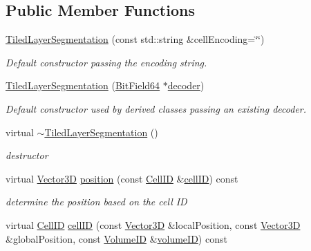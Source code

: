 \subsection*{Public Member Functions}
\begin{DoxyCompactItemize}
\item 
\hyperlink{class_d_d4hep_1_1_d_d_segmentation_1_1_tiled_layer_segmentation_a9f5fb19402d8d5bfbfb6d3db886bdfe3}{Tiled\+Layer\+Segmentation} (const std\+::string \&cell\+Encoding=\char`\"{}\char`\"{})
\begin{DoxyCompactList}\small\item\em Default constructor passing the encoding string. \end{DoxyCompactList}\item 
\hyperlink{class_d_d4hep_1_1_d_d_segmentation_1_1_tiled_layer_segmentation_ade81bfe57661f1faf98877b6e4de725e}{Tiled\+Layer\+Segmentation} (\hyperlink{class_d_d4hep_1_1_d_d_segmentation_1_1_bit_field64}{Bit\+Field64} $\ast$\hyperlink{class_d_d4hep_1_1_d_d_segmentation_1_1_segmentation_abec3489982d0fe91ef4b142d9d755576}{decoder})
\begin{DoxyCompactList}\small\item\em Default constructor used by derived classes passing an existing decoder. \end{DoxyCompactList}\item 
virtual \hyperlink{class_d_d4hep_1_1_d_d_segmentation_1_1_tiled_layer_segmentation_ac4a4730758ab96a1215fb55999503af2}{$\sim$\+Tiled\+Layer\+Segmentation} ()
\begin{DoxyCompactList}\small\item\em destructor \end{DoxyCompactList}\item 
virtual \hyperlink{struct_d_d4hep_1_1_d_d_segmentation_1_1_vector3_d}{Vector3D} \hyperlink{class_d_d4hep_1_1_d_d_segmentation_1_1_tiled_layer_segmentation_acc4571d3ad2ac352f1cfb7fc45d1f2b7}{position} (const \hyperlink{namespace_d_d4hep_1_1_d_d_segmentation_ac7af071d85cb48820914434a07e21ba1}{Cell\+ID} \&\hyperlink{class_d_d4hep_1_1_d_d_segmentation_1_1_tiled_layer_segmentation_acda10c2ad2f498c9b3b580baefe9a8cd}{cell\+ID}) const
\begin{DoxyCompactList}\small\item\em determine the position based on the cell ID \end{DoxyCompactList}\item 
virtual \hyperlink{namespace_d_d4hep_1_1_d_d_segmentation_ac7af071d85cb48820914434a07e21ba1}{Cell\+ID} \hyperlink{class_d_d4hep_1_1_d_d_segmentation_1_1_tiled_layer_segmentation_acda10c2ad2f498c9b3b580baefe9a8cd}{cell\+ID} (const \hyperlink{struct_d_d4hep_1_1_d_d_segmentation_1_1_vector3_d}{Vector3D} \&local\+Position, const \hyperlink{struct_d_d4hep_1_1_d_d_segmentation_1_1_vector3_d}{Vector3D} \&global\+Position, const \hyperlink{namespace_d_d4hep_1_1_d_d_segmentation_a61a6833a18d1800bdef176595f83e3ba}{Volume\+ID} \&\hyperlink{class_d_d4hep_1_1_d_d_segmentation_1_1_segmentation_a43c0e9648e3b7cded015847c0802f757}{volume\+ID}) const

\end{DoxyCompactItemize}
